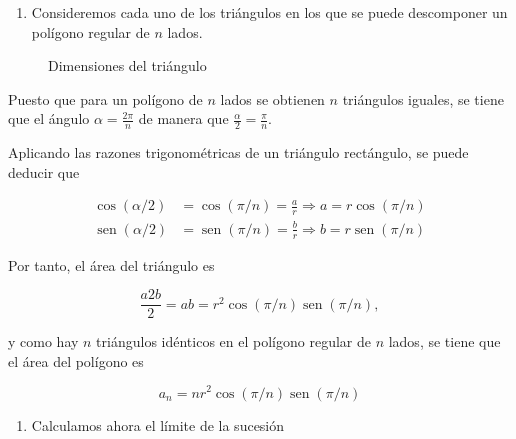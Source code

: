 \documentclass[
  a4paper,
]{scrreport}
\providecommand{\tightlist}{%
  \setlength{\itemsep}{0pt}\setlength{\parskip}{0pt}}\usepackage{longtable,booktabs,array}
\theoremstyle{definition}
\theoremstyle{remark}
\begin{document}
\begin{tcolorbox}[enhanced jigsaw, opacityback=0, title=\textcolor{quarto-callout-tip-color}{\faLightbulb}\hspace{0.5em}{Solución}, toptitle=1mm, colframe=quarto-callout-tip-color-frame, leftrule=.75mm, breakable, colback=white, left=2mm, bottomtitle=1mm, rightrule=.15mm, opacitybacktitle=0.6, arc=.35mm, coltitle=black, titlerule=0mm, colbacktitle=quarto-callout-tip-color!10!white, bottomrule=.15mm, toprule=.15mm]

\begin{enumerate}
\def\labelenumi{\alph{enumi}.}
\tightlist
\item
  Consideremos cada uno de los triángulos en los que se puede
  descomponer un polígono regular de \(n\) lados.
\end{enumerate}

\begin{figure}[H]

{\centering 



}

\caption{Dimensiones del triángulo}

\end{figure}

Puesto que para un polígono de \(n\) lados se obtienen \(n\) triángulos
iguales, se tiene que el ángulo \(\alpha=\frac{2\pi}{n}\) de manera que
\(\frac{\alpha}{2} = \frac{\pi}{n}\).

Aplicando las razones trigonométricas de un triángulo rectángulo, se
puede deducir que

\begin{align*}
\cos(\alpha/2) &= \cos(\pi/n) = \frac{a}{r} \Rightarrow a = r\cos(\pi/n)\\
\operatorname{sen}(\alpha/2) &= \operatorname{sen}(\pi/n) = \frac{b}{r} \Rightarrow b = r\operatorname{sen}(\pi/n)
\end{align*}

Por tanto, el área del triángulo es

\[
\frac{a2b}{2} = ab= r^2\cos(\pi/n)\operatorname{sen}(\pi/n),
\]

y como hay \(n\) triángulos idénticos en el polígono regular de \(n\)
lados, se tiene que el área del polígono es

\[
a_n  = n r^2\cos(\pi/n)\operatorname{sen}(\pi/n)
\]

\begin{enumerate}
\def\labelenumi{\alph{enumi}.}
\setcounter{enumi}{1}
\item
  Calculamos ahora el límite de la sucesión


\end{enumerate}
\end{tcolorbox}
\end{document}
